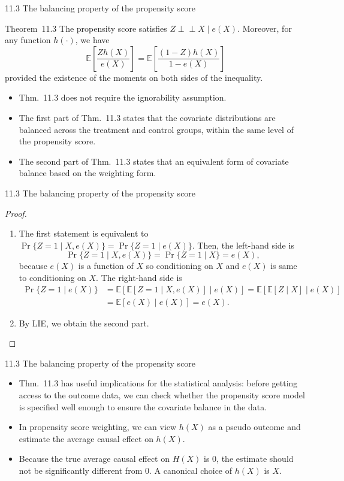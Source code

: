 \documentclass[aspectratio=169, 12pt]{beamer}
\newcommand{\indep}{\perp\!\!\!\perp}
\newcommand{\E}{\mathbb{E}}
\begin{document}
\begin{frame}{11.3 The balancing property of the propensity score}
  \begin{keybox}{Theorem~11.3}
    The propensity score satisfies $Z\indep X\mid e(X)$. Moreover, for any function $h(\cdot)$, we have
    \[
    \E\left[\frac{Zh(X)}{e(X)}\right]=\E\left[\frac{(1-Z)h(X)}{1-e(X)}\right]
    \]
    provided the existence of the moments on both sides of the inequality.
  \end{keybox}
  \begin{itemize}
    \item Thm.~11.3 does not require the ignorability assumption.
    \item The first part of Thm.~11.3 states that the covariate distributions are balanced across the treatment and control groups, within the same level of the propensity score.
    \item The second part of Thm.~11.3 states that an equivalent form of covariate balance based on the weighting form.
  \end{itemize}
\end{frame}

\begin{frame}{11.3 The balancing property of the propensity score}
  \small
  \begin{proof}
    \begin{enumerate}
      \item The first statement is equivalent to $\Pr\{Z=1\mid X,e(X)\}=\Pr\{Z=1\mid e(X)\}.$ Then, the left-hand side is
      \[
      \Pr\{Z=1\mid X,e(X)\} = \Pr\{Z=1\mid X\}=e(X),
      \]
      because $e(X)$ is a function of $X$ so conditioning on $X$ and $e(X)$ is same to conditioning on $X$. The right-hand side is
      \begin{align*}
        \Pr\{Z=1\mid e(X)\} &= \E[\E[Z=1\mid X,e(X)]\mid e(X)] = \E[\E[Z\mid X]\mid e(X)]\\&= \E[e(X)\mid e(X)] = e(X).
      \end{align*}
      \item By LIE, we obtain the second part. 
    \end{enumerate}
  \end{proof}
\end{frame}

\begin{frame}{11.3 The balancing property of the propensity score}
  \begin{itemize}
    \item Thm.~11.3 has useful implications for the statistical analysis: before getting access to the outcome data, we can check whether the propensity score model is specified well enough to ensure the covariate balance in the data.
    \item In propensity score weighting, we can view $h(X)$ as a pseudo outcome and estimate the average causal effect on $h(X)$. 
    \item Because the true average causal effect on $H(X)$ is $0$, the estimate should not be significantly different from $0$. A canonical choice of $h(X)$ is $X$.
  \end{itemize}
\end{frame}
\end{document}
